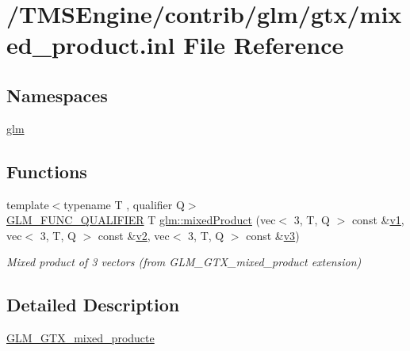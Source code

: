 \hypertarget{mixed__product_8inl}{}\section{/\+T\+M\+S\+Engine/contrib/glm/gtx/mixed\+\_\+product.inl File Reference}
\label{mixed__product_8inl}
\subsection*{Namespaces}
\begin{DoxyCompactItemize}
\item 
 \hyperlink{namespaceglm}{glm}
\end{DoxyCompactItemize}
\subsection*{Functions}
\begin{DoxyCompactItemize}
\item 
{\footnotesize template$<$typename T , qualifier Q$>$ }\\\hyperlink{setup_8hpp_a33fdea6f91c5f834105f7415e2a64407}{G\+L\+M\+\_\+\+F\+U\+N\+C\+\_\+\+Q\+U\+A\+L\+I\+F\+I\+ER} T \hyperlink{group__gtx__mixed__product_gab3c6048fbb67f7243b088a4fee48d020}{glm\+::mixed\+Product} (vec$<$ 3, T, Q $>$ const \&\hyperlink{_s_d_l__opengl__glext_8h_a435c176a02c061b43e19bdf7c86cceae}{v1}, vec$<$ 3, T, Q $>$ const \&\hyperlink{_s_d_l__opengl__glext_8h_a0928f6d0f0f794ba000a21dfae422136}{v2}, vec$<$ 3, T, Q $>$ const \&\hyperlink{_s_d_l__opengl__glext_8h_acc806b31cbf466ceba6555983d8b814d}{v3})
\begin{DoxyCompactList}\small\item\em Mixed product of 3 vectors (from G\+L\+M\+\_\+\+G\+T\+X\+\_\+mixed\+\_\+product extension) \end{DoxyCompactList}\end{DoxyCompactItemize}


\subsection{Detailed Description}
\hyperlink{group__gtx__mixed__product}{G\+L\+M\+\_\+\+G\+T\+X\+\_\+mixed\+\_\+producte} 